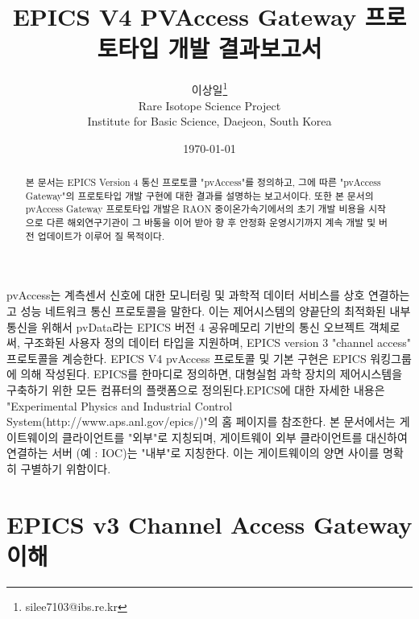\documentclass[11pt
  , a4paper
  , article
  , oneside
]{memoir}
\begin{document}
\newcommand{\technumber}{
  RAON Control-Document Series\\
  Revision : v1.0,   Release : 2016-12-02 fixed date}
\title{\textbf{EPICS V4 PVAccess Gateway 프로토타입 개발 결과보고서}}

\author{이상일\thanks{silee7103@ibs.re.kr} \\

  Rare Isotope Science Project\\
  Institute for Basic Science, Daejeon, South Korea
}
\date{\today}

\renewcommand{\maketitlehooka}{\begin{flushright}\textsf{\technumber}\end{flushright}}

\maketitle

\begin{abstract}
본 문서는 EPICS Version 4 통신 프로토콜 "pvAccess"를 정의하고, 그에 따른 "pvAccess Gateway"의 프로토타입 개발 구현에 대한 결과를 설명하는 보고서이다. 또한 본 문서의 pvAccess Gateway 프로토타입 개발은 RAON 중이온가속기에서의 초기 개발 비용을 시작으로 다른 해외연구기관이 그 바통을 이어 받아 향 후 안정화 운영시기까지 계속 개발 및 버전 업데이트가 이루어 질 목적이다. 
\end{abstract}

pvAccess는 계측센서 신호에 대한 모니터링 및 과학적 데이터 서비스를 상호 연결하는 고 성능 네트워크 통신 프로토콜을 말한다. 이는 제어시스템의 양끝단의 최적화된 내부통신을 위해서 pvData라는 EPICS 버전 4 공유메모리 기반의 통신 오브젝트 객체로써, 구조화된 사용자 정의 데이터 타입을 지원하며, EPICS version 3 "channel access" 프로토콜을 계승한다. EPICS V4 pvAccess 프로토콜 및 기본 구현은 EPICS 워킹그룹에 의해 작성된다. EPICS를 한마디로 정의하면, 대형실험 과학 장치의 제어시스템을 구축하기 위한 모든 컴퓨터의 플랫폼으로 정의된다.EPICS에 대한 자세한 내용은 "Experimental Physics and Industrial Control System(http://www.aps.anl.gov/epics/)"의 홈 페이지를 참조한다. 본 문서에서는 게이트웨이의 클라이언트를 "외부"로 지칭되며, 게이트웨이 외부 클라이언트를 대신하여 연결하는 서버 (예 : IOC)는 "내부"로 지칭한다. 이는 게이트웨이의 양면 사이를 명확히 구별하기 위함이다.

\clearpage

\chapter{EPICS v3 Channel Access Gateway 이해}
\end{document}
